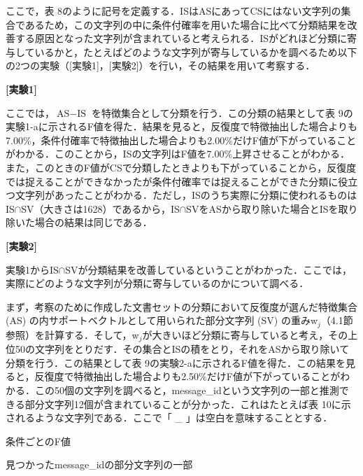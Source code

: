 \documentclass[japanese]{jnlp_1.4}
\begin{document}
ここで，表 
8のように記号を定義する．ISはASにあってCSにはない文字列の集合であるため，この文字列の中に条件付確率を用いた場合に比べて分類結果を改善する原因となった文字列が含まれていると考えられる．ISがどれほど分類に寄与しているかと，たとえばどのような文字列が寄与しているかを調べるため以下の2つの実験（[実験1]，[実験2]）を行い，その結果を用いて考察する．

\noindent
\textbf{[実験1]}

ここでは，$\text{AS}-\text{IS}$ を特徴集合として分類を行う．この分類の結果として表 
9の実験1-aに示されるF値を得た．結果を見ると，反復度で特徴抽出した場合よりも7.00{\%}，条件付確率で特徴抽出した場合よりも2.00{\%}だけF値が下がっていることがわかる．このことから，ISの文字列はF値を7.00{\%}上昇させることがわかる．また，このときのF値がCSで分類したときよりも下がっていることから，反復度では捉えることができなかったが条件付確率では捉えることができた分類に役立つ文字列があったことがわかる．ただし，ISのうち実際に分類に使われるものは 
IS$\cap $SV（大きさは1628）であるから，IS$\cap 
$SVをASから取り除いた場合とISを取り除いた場合の結果は同じである．

\noindent
\textbf{[実験2]}

 実験1からIS$\cap 
$SVが分類結果を改善しているということがわかった．ここでは，実際にどのような文字列が分類に寄与しているのかについて調べる．

まず，考察のために作成した文書セットの分類において反復度が選んだ特徴集合 (AS) の内サポートベクトルとして用いられた部分文字列 (SV) の重みw$_{j}$（4.1節参照）を計算する．そして，w$_{j}$が大きいほど分類に寄与していると考え，その上位50の文字列をとりだす．その集合とISの積をとり，それをASから取り除いて分類を行う．この結果として表 
9の実験2-aに示されるF値を得た．この結果を見ると，反復度で特徴抽出した場合よりも2.50{\%}だけF値が下がっていることがわかる．この50個の文字列を調べると，message{\_}idという文字列の一部と推測できる部分文字列12個が含まれていることが分かった．これはたとえば表 
10に示されるような文字列である．ここで「 {\_} 」は空白を意味することとする．

\begin{table}[b]
\hfill\begin{minipage}[t]{100pt}
\caption{条件ごとのF値}

\end{minipage}
\hfill
\begin{minipage}[t]{210pt}
\caption{見つかったmessage{\_}idの部分文字列の一部}

\end{minipage}
\hfill
\end{table}
\end{document}

